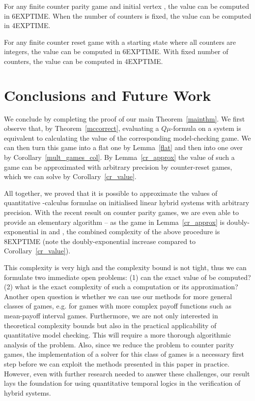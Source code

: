 \documentclass[fleqn,envcountsame]{LMCS}
\newcommand{\Qmu}{\ensuremath{Q\mu}\xspace}
\begin{document}
\begin{thm}
For any finite counter parity game  and initial vertex ,
the value  can be computed in \textsc{6EXPTIME}.
When the number of counters is fixed, the value can be computed
in \textsc{4EXPTIME}.
\end{thm}

\begin{cor} \label{cr_value}
For any finite counter reset game  with a starting state  where all
counters are integers, the value  can be computed in
\textsc{6EXPTIME}. With fixed number of counters, the value
can be computed in \textsc{4EXPTIME}.
\end{cor}


\section{Conclusions and Future Work}

We conclude by completing the proof of our main Theorem~\ref{mainthm}.
We first observe that, by Theorem~\ref{mccorrect}, evaluating a
\Qmu-formula on a system is equivalent to calculating the value of the 
corresponding model-checking game. We can then turn this game into a
flat one by Lemma~\ref{flat} and then into one over  by
Corollary~\ref{mult_games_col}.
By Lemma~\ref{cr_approx} the value of such a game can be approximated
with arbitrary precision by counter-reset games, which we can solve
by Corollary~\ref{cr_value}.

All together, we proved that it is possible to approximate the values
of quantitative -calculus formulae on initialised linear hybrid
systems with arbitrary precision. With the recent result on counter parity
games, we are even able to provide an elementary algorithm -- as the game
 in Lemma~\ref{cr_approx} is doubly-exponential in  and ,
the combined complexity of the above procedure is \textsc{8EXPTIME}
(note the doubly-exponential increase compared to Corollary~\ref{cr_value}).

This complexity is very high and the complexity bound is not tight,
thus we can formulate two immediate open problems: (1) can the exact
value of  be computed? (2) what is the exact complexity
of such a computation or its approximation? 
Another open question is whether we can use our methods for more general
classes of games, e.g. for games with more complex payoff functions such as
mean-payoff interval games. Furthermore, we are not only interested in
theoretical complexity bounds but also in the practical applicability of
quantitative model checking. This will require a more thorough algorithmic
analysis of the problem. Also, since we reduce the problem to counter parity
games, the implementation of a solver for this class of games is a necessary
first step before we can exploit the methods presented in this paper in
practice. However, even with further research needed to answer these challenges,
our result lays the foundation for using quantitative temporal logics in
the verification of hybrid systems.
\end{document}
